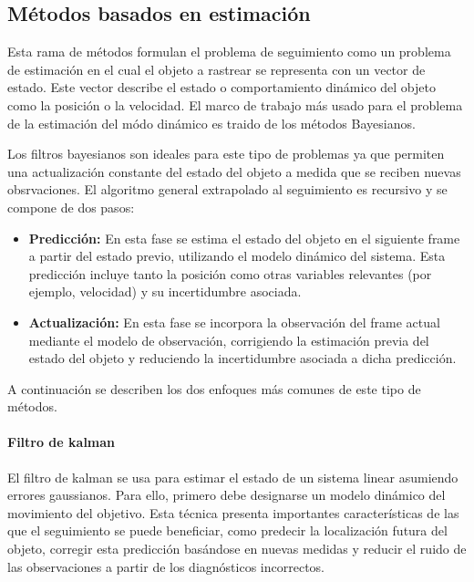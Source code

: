\subsection{Métodos basados en estimación}
Esta rama de métodos formulan el problema de seguimiento como un problema de estimación en el cual el objeto a rastrear se representa con un vector de estado. Este vector describe el estado o comportamiento dinámico del objeto como la posición o la velocidad. El marco de trabajo más usado para el problema de la estimación del módo dinámico es traido de los métodos Bayesianos. 

Los filtros bayesianos son ideales para este tipo de problemas ya que permiten una actualización constante del estado del objeto  a medida que se reciben nuevas obsrvaciones. El algoritmo general extrapolado al seguimiento es recursivo y se compone de dos pasos: 

\begin{itemize}
    \item \textbf{Predicción:} En esta fase se estima el estado del objeto en el siguiente frame a partir del estado previo, utilizando el modelo dinámico del sistema. Esta predicción incluye tanto la posición como otras variables relevantes (por ejemplo, velocidad) y su incertidumbre asociada.
    
    \item \textbf{Actualización:} En esta fase se incorpora la observación del frame actual mediante el modelo de observación, corrigiendo la estimación previa del estado del objeto y reduciendo la incertidumbre asociada a dicha predicción.
\end{itemize}

A continuación se describen los dos enfoques más comunes de este tipo de métodos.

\paragraph{Filtro de kalman}
El filtro de kalman se usa para estimar el estado de un sistema linear asumiendo errores gaussianos. Para ello, primero debe designarse un modelo dinámico del movimiento del objetivo. Esta técnica presenta importantes características de las que el seguimiento se puede beneficiar, como predecir la localización futura del objeto, corregir esta predicción basándose en nuevas medidas y reducir el ruido de las observaciones a partir de los diagnósticos incorrectos. 

